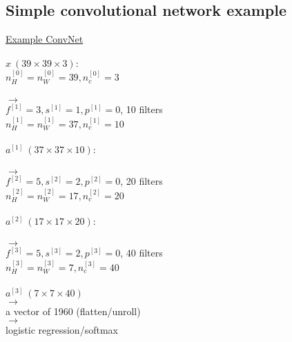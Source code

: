 %
\subsection{Simple convolutional network example}
\underline{Example ConvNet}\\\\
$x ~ (39 \times 39 \times 3):$\\
$n_H^{[0]} = n_W^{[0]} = 39, n_c^{[0]} =3$\\
\\
$\longrightarrow$\\
$f^{[1]} = 3, s^{[1]} = 1, p^{[1]} = 0$, 10 filters\\
$n_H^{[1]} = n_W^{[1]} = 37, n_c^{[1]} =10$\\
\\
$a^{[1]} ~ (37 \times 37 \times 10):$\\
\\
$\longrightarrow$\\
$f^{[2]} = 5, s^{[2]} = 2, p^{[2]} = 0$, 20 filters\\
$n_H^{[2]} = n_W^{[2]} = 17, n_c^{[2]} =20$\\
\\
$a^{[2]} ~ (17 \times 17 \times 20):$\\
\\
$\longrightarrow$\\
$f^{[3]} = 5, s^{[3]} = 2, p^{[3]} = 0$, 40 filters\\
$n_H^{[3]} = n_W^{[3]} = 7, n_c^{[3]} =40$\\
\\
$a^{[3]} ~ (7 \times 7 \times 40)$\\
$\longrightarrow$\\
a vector of 1960 (flatten/unroll)\\
$\longrightarrow$\\
logistic regression/softmax
\\
%
